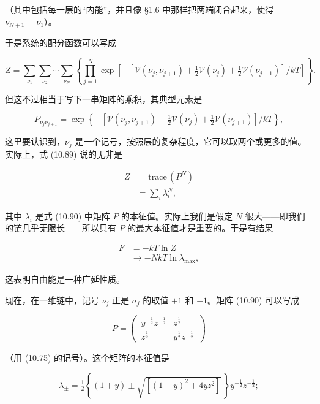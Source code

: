 （其中包括每一层的“内能”，并且像 §1.6 中那样把两端闭合起来，使得 $\nu_{N+1} \equiv \nu_1$）。

于是系统的配分函数可以写成

\begin{equation*}
Z = \sum_{\nu_1}\sum_{\nu_2}\cdots\sum_{\nu_N}\left\{\prod_{j=1}^{N}\exp\left[-\left[\mathcal{V}(\nu_j, \nu_{j+1}) + \tfrac{1}{2}\mathcal{V}(\nu_j) + \tfrac{1}{2}\mathcal{V}(\nu_{j+1})\right]/kT\right]\right\}.
\tag{10.89}
\end{equation*}

但这不过相当于写下一串矩阵的乘积，其典型元素是

\begin{equation*}
P_{\nu_j\nu_{j+1}} = \exp\left\{-\left[\mathcal{V}(\nu_j, \nu_{j+1}) + \tfrac{1}{2}\mathcal{V}(\nu_j) + \tfrac{1}{2}\mathcal{V}(\nu_{j+1})\right]/kT\right\},
\tag{10.90}
\end{equation*}

这里要认识到，$\nu_j$ 是一个记号，按照层的复杂程度，它可以取两个或更多的值。实际上，式 (10.89) 说的无非是

\begin{align*}
Z &= \mathrm{trace}\,(P^N)\\
&= \sum_i \lambda_i^N,
\tag{10.91}
\end{align*}

其中 $\lambda_i$ 是式 (10.90) 中矩阵 $P$ 的本征值。实际上我们是假定 $N$ 很大——即我们的链几乎无限长——所以只有 $P$ 的最大本征值才是重要的。于是有结果

\begin{align*}
F &= -kT\ln Z\\
&\to -NkT\ln\lambda_{\max},
\tag{10.92}
\end{align*}

这表明自由能是一种广延性质。

现在，在一维链中，记号 $\nu_j$ 正是 $\sigma_j$ 的取值 $+1$ 和 $-1$。矩阵 (10.90) 可以写成

\begin{equation*}
P = \begin{pmatrix}\, y^{-\frac{1}{2}}z^{-\frac{1}{2}} & z^{\frac{1}{2}}\,\\[2pt]\, z^{\frac{1}{2}} & y^{\frac{1}{2}}z^{-\frac{1}{2}}\, \end{pmatrix}
\tag{10.93}
\end{equation*}

（用 (10.75) 的记号）。这个矩阵的本征值是

\begin{equation*}
\lambda_{\pm} = \tfrac{1}{2}\left\{(1+y) \pm \sqrt{\left[(1-y)^2 + 4yz^2\right]}\,\right\} y^{-\frac{1}{2}}z^{-\frac{1}{2}};
\tag{10.94}
\end{equation*}

